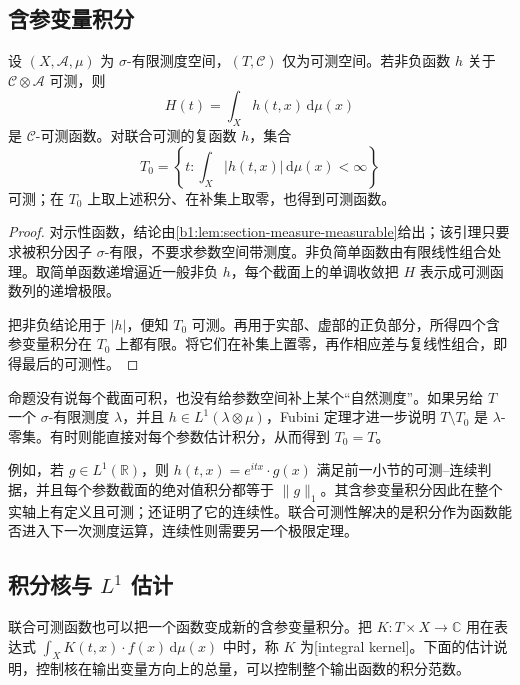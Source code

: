 \subsection{含参变量积分}
\label{b1:subsec:070402}

\begin{proposition}\label{b1:prop:parameter-integral-measurability}
设 \((X,\mathcal A,\mu)\) 为 \(\sigma\)-有限测度空间，\((T,\mathcal C)\) 仅为可测空间。若非负函数 \(h\) 关于 \(\mathcal C\otimes\mathcal A\) 可测，则
\[
H(t)=\int_Xh(t,x)\,\mathrm d\mu(x)
\]
是 \(\mathcal C\)-可测函数。对联合可测的复函数 \(h\)，集合
\[
T_0=\left\{t:\int_X|h(t,x)|\,\mathrm d\mu(x)<\infty\right\}
\]
可测；在 \(T_0\) 上取上述积分、在补集上取零，也得到可测函数。
\end{proposition}
\begin{proof}
对示性函数，结论由\cref{b1:lem:section-measure-measurable}给出；该引理只要求被积分因子 \(\sigma\)-有限，不要求参数空间带测度。非负简单函数由有限线性组合处理。取简单函数递增逼近一般非负 \(h\)，每个截面上的单调收敛把 \(H\) 表示成可测函数列的递增极限。

把非负结论用于 \(|h|\)，便知 \(T_0\) 可测。再用于实部、虚部的正负部分，所得四个含参变量积分在 \(T_0\) 上都有限。将它们在补集上置零，再作相应差与复线性组合，即得最后的可测性。
\end{proof}

命题没有说每个截面可积，也没有给参数空间补上某个“自然测度”。如果另给 \(T\) 一个 \(\sigma\)-有限测度 \(\lambda\)，并且 \(h\in L^1(\lambda\otimes\mu)\)，Fubini 定理才进一步说明 \(T\setminus T_0\) 是 \(\lambda\)-零集。有时则能直接对每个参数估计积分，从而得到 \(T_0=T\)。

\ProseParagraphBreak

例如，若 \(g\in L^1(\mathbb R)\)，则 \(h(t,x)=e^{itx}\cdot g(x)\) 满足前一小节的可测--连续判据，并且每个参数截面的绝对值积分都等于 \(\|g\|_1\)。其含参变量积分因此在整个实轴上有定义且可测；还证明了它的连续性。联合可测性解决的是积分作为函数能否进入下一次测度运算，连续性则需要另一个极限定理。

\subsection{积分核与 \texorpdfstring{\(L^1\)}{L1} 估计}
\label{b1:subsec:070403}

联合可测函数也可以把一个函数变成新的含参变量积分。把 \(K:T\times X\rightarrow\mathbb C\) 用在表达式 \(\int_XK(t,x)\cdot f(x)\,\mathrm d\mu(x)\) 中时，称 \(K\) 为[integral kernel]。下面的估计说明，控制核在输出变量方向上的总量，可以控制整个输出函数的积分范数。

